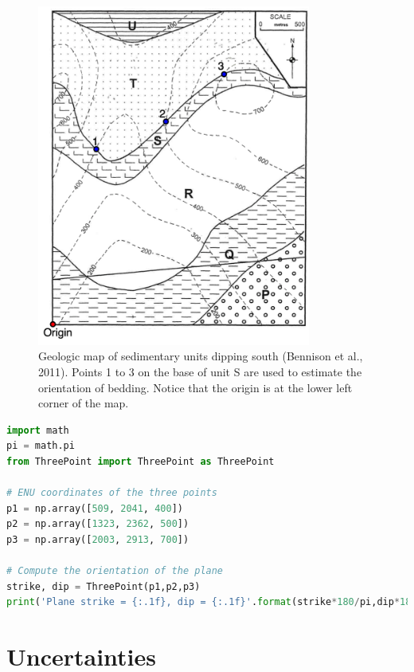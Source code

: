 \documentclass[a4paper , 12pt]{book}
\begin{document}
\begin{figure}[ht]
    \centering
    \includegraphics[width=9cm]{Figures/ch4f7.png}
    \caption{Geologic map of sedimentary units dipping south (Bennison et al., 2011). Points 1 to 3 on the base of unit S are used to estimate the orientation of bedding. Notice that the origin is at the lower left corner of the map.}
\end{figure}

\begin{center}
\begin{lstlisting}[language=Python, frame=single]
import math
pi = math.pi
from ThreePoint import ThreePoint as ThreePoint

# ENU coordinates of the three points
p1 = np.array([509, 2041, 400])
p2 = np.array([1323, 2362, 500])
p3 = np.array([2003, 2913, 700])

# Compute the orientation of the plane
strike, dip = ThreePoint(p1,p2,p3)
print('Plane strike = {:.1f}, dip = {:.1f}'.format(strike*180/pi,dip*180/pi))
\end{lstlisting}
\end{center}

\section{Uncertainties}\label{calcuncertainties}
\end{document}
